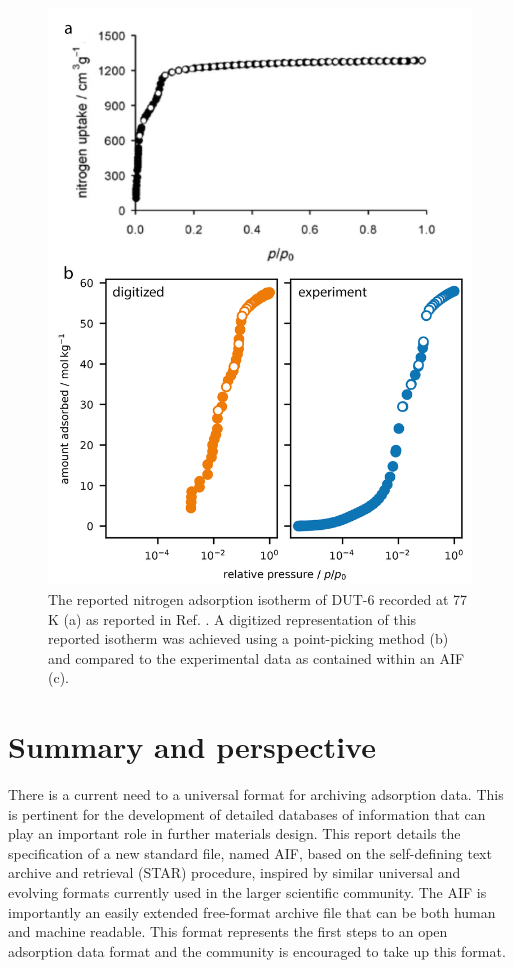 \documentclass[journal=langd5,manuscript=article]{achemso}
\begin{document}
  
  \begin{figure}[htb]
    \includegraphics{./figures/example-01.png}
      \caption{The reported nitrogen adsorption isotherm of DUT-6 recorded at 77$\,$K (a) as reported in Ref. . A digitized representation of this reported isotherm was achieved using a point-picking method (b) and compared to the experimental data as contained within an AIF (c).}
      \label{fgr:example}
    \end{figure}


\section{Summary and perspective}
There is a current need to a universal format for archiving adsorption data.
This is pertinent for the development of detailed databases of information that can play an important role in further materials design.\cite{10.1021/acs.chemmater.9b03376}
This report details the specification of a new standard file, named AIF, based on the self-defining text archive and retrieval (STAR) procedure, inspired by similar universal and evolving formats currently used in the larger scientific community.
The AIF is importantly an easily extended free-format archive file that can be both human and machine readable.
This format represents the first steps to an open adsorption data format and the community is encouraged to take up this format.
\end{document}
